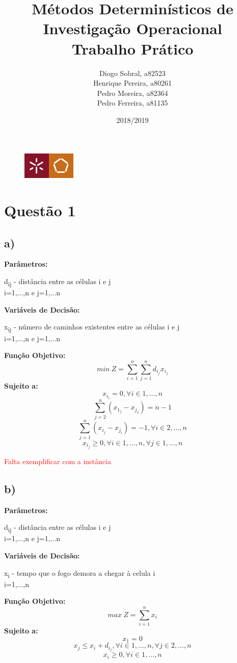 \documentclass[11pt]{article} %
\title{Métodos Determinísticos de Investigação Operacional \\ \large Trabalho Prático}
\author{Diogo Sobral, a82523 \\ Henrique Pereira, a80261 \\ Pedro Moreira, a82364 \\ Pedro Ferreira, a81135}
\date{2018/2019}
\begin{document}
\maketitle

\begin{figure}[!b]
    \centering
    \includegraphics[width=1in]{um_eeng.jpg}
\end{figure}

\newpage

\section*{Questão 1}
\subsection*{a)}
\textbf{Parâmetros:}  \\
\begin{center}
d\textsubscript{ij} - distância entre as células i e j \\
i=1,...,n e j=1,...n \\
\end{center}
\textbf{Variáveis de Decisão:} \\
\begin{center}
x\textsubscript{ij} - número de caminhos existentes entre as células i e j \\
i=1,...,n e j=1,...n \\
\end{center}
\textbf{Função Objetivo:} \\
$$min \ Z = \sum_{i=1}^{n} \sum_{j=1}^{n} d_i_jx_i_j$$
\textbf{Sujeito a:}
$$x_i_i = 0, \forall i \in 1,...,n$$
$$\sum_{j=2}^{n} (x_1_j - x_j_1) = n-1$$
$$\sum_{j=1}^{n} (x_i_j - x_j_i) = -1, \forall i \in 2,...,n $$
$$x_i_j \geq 0, \forall i \in 1,...,n , \forall j \in 1,...,n$$

\textcolor{red}{Falta exemplificar com a instância}

\subsection*{b)}

\textbf{Parâmetros:}  \\
\begin{center}
d\textsubscript{ij} - distância entre as células i e j \\
i=1,...,n e j=1,...n \\
\end{center}
\textbf{Variáveis de Decisão:} \\
\begin{center}
x\textsubscript{i} - tempo que o fogo demora a chegar à celula i \\
i=1,...,n\\
\end{center}
\textbf{Função Objetivo:} \\
$$max \ Z = \sum_{i=1}^{n} x_i$$
\textbf{Sujeito a:}
$$x_1 = 0$$
$$x_j \leq x_i + d_i_j, \forall i \in 1,...,n , \forall j \in 2,...,n$$
$$x_i \geq 0, \forall i \in 1,...,n$$
\end{document}
